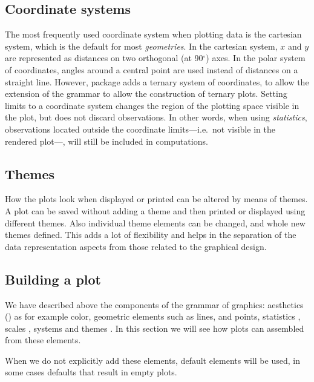 \documentclass[krantz2]{krantz}\usepackage{knitr}%
\begin{document}
\subsection{Coordinate systems}

The most frequently used coordinate system when plotting data is the cartesian system, which is the default for most \emph{geometries}. In the cartesian system, $x$ and $y$ are represented as distances on two orthogonal (at 90$^\circ$) axes. In the polar system of coordinates, angles around a central point are used instead of distances on a straight line. However, package  adds a ternary system of coordinates, to allow the extension of the grammar to allow the construction of ternary plots. Setting limits to a coordinate system changes the region of the plotting space visible in the plot, but does not discard observations. In other words, when using \emph{statistics}, observations located outside the coordinate limits---i.e.\ not visible in the rendered plot---, will still be included in computations.

\subsection{Themes}

How the plots look when displayed or printed can be altered by means of themes. A plot can be saved without adding a theme and then printed or displayed using different themes. Also individual theme elements can be changed, and whole new themes defined. This adds a lot of flexibility and helps in the separation of the data representation aspects from those related to the graphical design.

\subsection{Building a plot}

We have described above the components of the grammar of graphics: aesthetics () as for example color, geometric elements  such as lines, and points, statistics , scales ,  systems and themes . In this section we will see how plots can assembled from these elements.

When we do not explicitly add these elements, default elements will be used, in some cases defaults that result in empty plots.
\end{document}
